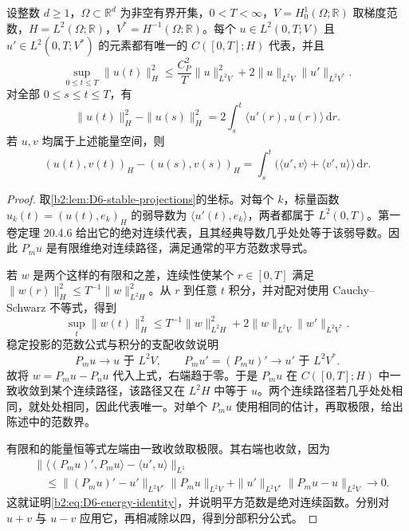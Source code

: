 \begin{theorem}[能量空间的时间迹与分部积分]\label{b2:thm:D6-time-trace}
设整数 \(d\geq1\)，\(\Omega\subset\mathbb R^d\) 为非空有界开集，\(0<T<\infty\)，\(V=H_0^1(\Omega;\mathbb R)\) 取梯度范数，\(H=L^2(\Omega;\mathbb R)\)，\(V^*=H^{-1}(\Omega;\mathbb R)\)。每个 \(u\in L^2(0,T;V)\) 且 \(u'\in L^2(0,T;V^*)\) 的元素都有唯一的 \(C([0,T];H)\) 代表，并且
\[
 \sup_{0\leq t\leq T}\|u(t)\|_H^2
 \leq \frac{C_P^2}{T}\|u\|_{L^2V}^2
       +2\|u\|_{L^2V}\|u'\|_{L^2V^*}.
\]
对全部 \(0\leq s\leq t\leq T\)，有
\begin{equation}\label{b2:eq:D6-energy-identity}
 \|u(t)\|_H^2-\|u(s)\|_H^2
 =2\int_s^t\langle u'(r),u(r)\rangle\,\mathrm dr.
\end{equation}
若 \(u,v\) 均属于上述能量空间，则
\[
 (u(t),v(t))_H-(u(s),v(s))_H
 =\int_s^t\bigl(\langle u',v\rangle+\langle v',u\rangle\bigr)\,\mathrm dr.
\]
\end{theorem}
\begin{proof}
取\cref{b2:lem:D6-stable-projections}的坐标。对每个 \(k\)，标量函数 \(u_k(t)=(u(t),e_k)_H\) 的弱导数为 \(\langle u'(t),e_k\rangle\)，两者都属于 \(L^2(0,T)\)。第一卷定理 20.4.6 给出它的绝对连续代表，且其经典导数几乎处处等于该弱导数。因此 \(P_mu\) 是有限维绝对连续路径，满足通常的平方范数求导式。

若 \(w\) 是两个这样的有限和之差，连续性使某个 \(r\in[0,T]\) 满足
\(\|w(r)\|_H^2\leq T^{-1}\|w\|_{L^2H}^2\)。从 \(r\) 到任意 \(t\) 积分，并对配对使用 Cauchy--Schwarz 不等式，得到
\[
 \sup_t\|w(t)\|_H^2
 \leq T^{-1}\|w\|_{L^2H}^2
       +2\|w\|_{L^2V}\|w'\|_{L^2V^*}.
\]
稳定投影的范数公式与积分的支配收敛说明
\[
 P_mu\to u\text{ 于 }L^2V,\qquad
 P_mu'= (P_mu)'\to u'\text{ 于 }L^2V^*.
\]
故将 \(w=P_mu-P_nu\) 代入上式，右端趋于零。于是 \(P_mu\) 在 \(C([0,T];H)\) 中一致收敛到某个连续路径，该路径又在 \(L^2H\) 中等于 \(u\)。两个连续路径若几乎处处相同，就处处相同，因此代表唯一。对单个 \(P_mu\) 使用相同的估计，再取极限，给出陈述中的范数界。

有限和的能量恒等式左端由一致收敛取极限。其右端也收敛，因为
\[
 \begin{aligned}
 &\|\langle(P_mu)',P_mu\rangle-\langle u',u\rangle\|_{L^1}\\
 &\quad\leq\|(P_mu)'-u'\|_{L^2V^*}\|P_mu\|_{L^2V}
       +\|u'\|_{L^2V^*}\|P_mu-u\|_{L^2V}\longrightarrow0.
 \end{aligned}
\]
这就证明\eqref{b2:eq:D6-energy-identity}，并说明平方范数是绝对连续函数。分别对 \(u+v\) 与 \(u-v\) 应用它，再相减除以四，得到分部积分公式。
\end{proof}

